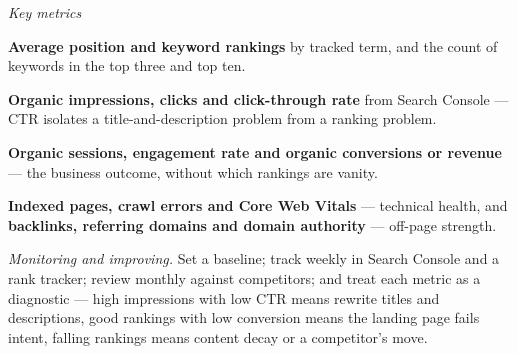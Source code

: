 \begin{qlist}
\textit{Key metrics}
\begin{apts}
\item \textbf{Average position and keyword rankings} by tracked term, and the
      count of keywords in the top three and top ten.
\item \textbf{Organic impressions, clicks and click-through rate} from Search
      Console --- CTR isolates a title-and-description problem from a ranking
      problem.
\item \textbf{Organic sessions, engagement rate and organic conversions or
      revenue} --- the business outcome, without which rankings are vanity.
\item \textbf{Indexed pages, crawl errors and Core Web Vitals} --- technical
      health, and \textbf{backlinks, referring domains and domain authority} ---
      off-page strength.
\end{apts}

\textit{Monitoring and improving.} Set a baseline; track weekly in Search
Console and a rank tracker; review monthly against competitors; and treat each
metric as a diagnostic --- high impressions with low CTR means rewrite titles
and descriptions, good rankings with low conversion means the landing page
fails intent, falling rankings means content decay or a competitor's move.


\end{qlist}
